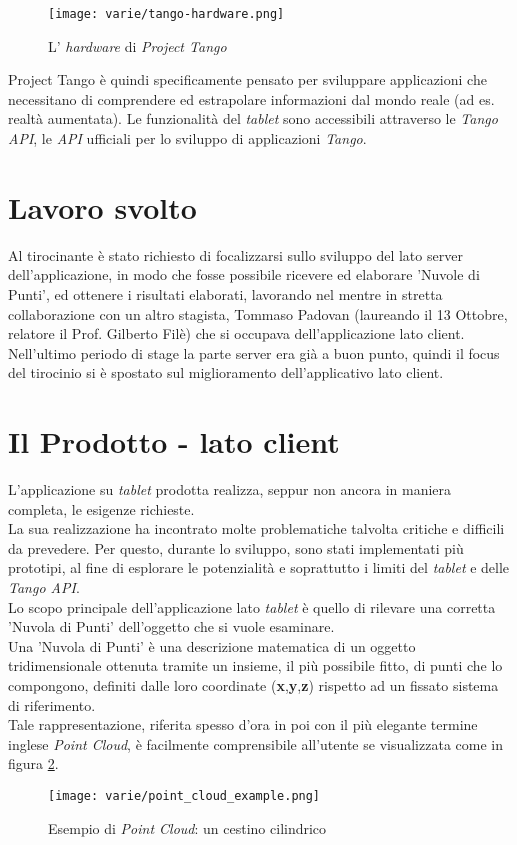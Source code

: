\begin{figure}[!h] 
    \centering 
    \texttt{[image: varie/tango-hardware.png]} 
    \caption{L' \emph{hardware} di \emph{Project Tango}}
    \label{fig:tango_hardware}
\end{figure}

\noindent
Project Tango è quindi specificamente pensato per sviluppare applicazioni che necessitano di comprendere ed estrapolare informazioni dal mondo reale (ad es. realtà aumentata).
Le funzionalità del \emph{tablet} sono accessibili attraverso le \emph{Tango API}, le \emph{API} ufficiali per lo sviluppo di applicazioni \emph{Tango}.

\section{Lavoro svolto}
Al tirocinante è stato richiesto di focalizzarsi sullo sviluppo del lato server dell'applicazione, in modo che fosse possibile ricevere ed elaborare 'Nuvole di Punti', ed ottenere i risultati elaborati, lavorando nel mentre in stretta collaborazione con un altro stagista, Tommaso Padovan (laureando il 13 Ottobre, relatore il Prof. Gilberto Filè) che si occupava dell'applicazione lato client. Nell'ultimo periodo di stage la parte server era già a buon punto, quindi il focus del tirocinio si è spostato sul miglioramento dell'applicativo lato client.

\section{Il Prodotto - lato client}

L'applicazione su \emph{tablet} prodotta realizza, seppur non ancora in maniera completa, le esigenze richieste. \\
La sua realizzazione ha incontrato molte problematiche talvolta critiche e difficili da prevedere. Per questo, durante lo sviluppo, sono stati implementati più prototipi, al fine di esplorare le potenzialità e soprattutto i limiti del \emph{tablet} e delle \emph{Tango API}. \\
Lo scopo principale dell'applicazione lato \emph{tablet} è quello di rilevare una corretta 'Nuvola di Punti' dell'oggetto che si vuole esaminare.\\
Una 'Nuvola di Punti' è una descrizione matematica di un oggetto tridimensionale ottenuta tramite un insieme, il più possibile fitto, di punti che lo compongono, definiti dalle loro coordinate (\textbf{x},\textbf{y},\textbf{z}) rispetto ad un fissato sistema di riferimento. \\
Tale rappresentazione, riferita spesso d'ora in poi con il più elegante termine inglese \emph{Point Cloud}, è facilmente comprensibile all'utente se visualizzata come in figura \ref{fig:point_cloud_example}.
\begin{figure}[!h] 
    \centering 
    \texttt{[image: varie/point\_cloud\_example.png]} 
    \caption{Esempio di \emph{Point Cloud}: un cestino cilindrico}
   \label{fig:point_cloud_example}
\end{figure}

